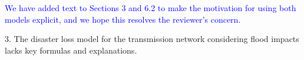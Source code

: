 \documentclass[authoryear,preprint,review,12pt]{elsarticle}\usepackage{amssymb}
\begin{document}
\textcolor{blue}{
We have added text to Sections 3 and 6.2 to make the motivation for using both models explicit, and we hope this resolves the reviewer's concern.} 

3. The disaster loss model for the transmission network considering flood impacts lacks key formulas and explanations.

\end{document}
